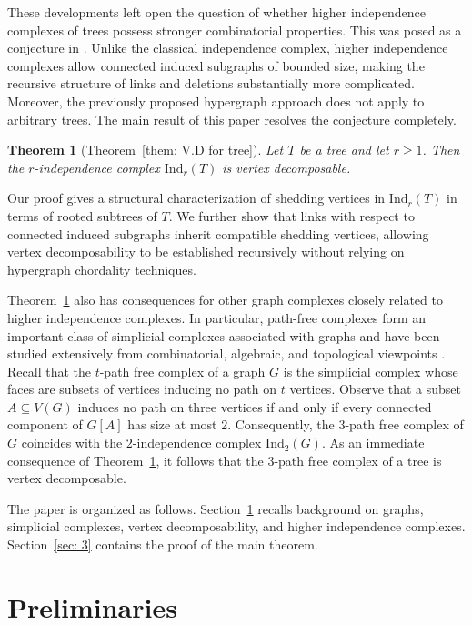 \documentclass[12pt,reqno]{amsart}
\newtheorem{theorem}{Theorem}[section]
\theoremstyle{definition}
\def\Ind{\mathrm{Ind}}
\begin{document}
These developments left open the question of whether higher independence complexes of trees possess stronger combinatorial properties. This was posed as a conjecture in \cite{PD23chordal}. Unlike the classical independence complex, higher independence complexes allow connected induced subgraphs of bounded size, making the recursive structure of links and deletions substantially more complicated. Moreover, the previously proposed hypergraph approach does not apply to arbitrary trees. The main result of this paper resolves the conjecture completely.

\begin{theorem}[Theorem~\ref{them: V.D for tree}]\label{them: main}
Let $T$ be a tree and let $r \ge 1$. Then the $r$-independence complex $\Ind_r(T)$ is vertex decomposable.
\end{theorem}

Our proof gives a structural characterization of shedding vertices in $\Ind_r(T)$ in terms of rooted subtrees of $T$. We further show that links with respect to connected induced subgraphs inherit compatible shedding vertices, allowing vertex decomposability to be established recursively without relying on hypergraph chordality techniques.

Theorem~\ref{them: main} also has consequences for other graph complexes closely related to higher independence complexes. In particular, path-free complexes form an important class of simplicial complexes associated with graphs and have been studied extensively from combinatorial, algebraic, and topological viewpoints \cite{AKK24,Bi24,AH09,SM11}. Recall that the $t$-path free complex of a graph $G$ is the simplicial complex whose faces are subsets of vertices inducing no path on $t$ vertices. Observe that a subset $A\subseteq V(G)$ induces no path on three vertices if and only if every connected component of $G[A]$ has size at most $2$. Consequently, the $3$-path free complex of $G$ coincides with the $2$-independence complex $\Ind_2(G)$. As an immediate consequence of Theorem~\ref{them: main}, it follows that the $3$-path free complex of a tree is vertex decomposable.

The paper is organized as follows. Section~\ref{sec: 2} recalls background on graphs, simplicial complexes, vertex decomposability, and higher independence complexes. Section~\ref{sec: 3} contains the proof of the main theorem.

\section{Preliminaries}\label{sec: 2}
\end{document}
